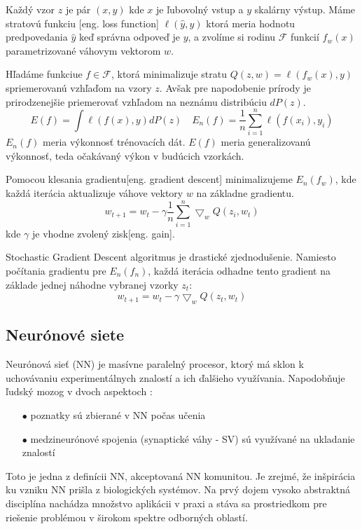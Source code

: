 Každý vzor $z$ je pár $(x, y)$ kde $x$ je ľubovolný vstup a $y$ skalárny výstup.
Máme stratovú funkciu [eng. loss function] $\ell(\hat{y},y)$ ktorá meria hodnotu predpovedania $\hat{y}$ keď správna odpoveď je $y$,
    a zvolíme si rodinu $\mathcal{F}$ funkcií $f_w(x)$ parametrizované váhovym vektorom $w$.

Hľadáme funkciue $f \in \mathcal{F}$, ktorá minimalizuje stratu $Q(z,w) = \ell(f_w(x), y)$ spriemerovanú vzhľaďom na vzory $z$.
Avšak pre napodobenie prírody je prirodzenejšie priemerovať vzhľadom na neznámu distribúciu $dP(z)$\cite{prop:StochasticGradientDescent}.
\begin{equation}
    E(f) = \int{\ell(f(x), y)dP(z)} \quad E_n(f) = \frac{1}{n}\sum_{i=1}^{n}\ell(f(x_i), y_i)
\end{equation}
$E_n(f)$ meria výkonnosť trénovacích dát. $E(f)$ meria generalizovanú výkonnosť, teda očakávaný výkon v budúcich vzorkách.

Pomocou klesania gradientu[eng. gradient descent] minimalizujeme $E_n(f_w)$, kde každá iterácia aktualizuje váhove vektory $w$ na základne gradientu.
\begin{equation}
    w_{t+1} = w_t - \gamma \frac{1}{n}\sum_{i=1}^{n}\bigtriangledown_w Q(z_i, w_t)
\end{equation}
kde $\gamma$ je vhodne zvolený zisk[eng. gain].

Stochastic Gradient Descent algoritmus je drastické zjednodušenie.
Namiesto počítania gradientu pre $E_n(f_n)$, každá iterácia odhadne tento gradient na základe jednej náhodne vybranej vzorky $z_t$\cite{prop:StochasticGradientDescent}:
\begin{equation}
    w_{t+1} = w_t - \gamma \bigtriangledown_w Q(z_t, w_t)
\end{equation}


\subsection{Neurónové siete}
Neurónová sieť (NN) je masívne paralelný procesor, ktorý má sklon k uchovávaniu experimentálnych znalostí a ich ďalšieho využívania.
Napodobňuje ľudský mozog v dvoch aspektoch \cite{odkaz:NNIntroduction}:
\begin{enumerate}
	\item[$\bullet$] poznatky sú zbierané v NN počas učenia
	\item[$\bullet$] medzineurónové spojenia (synaptické váhy - SV) sú využívané na ukladanie znalostí
\end{enumerate}
Toto je jedna z definícii NN, akceptovaná NN komunitou.
Je zrejmé, že inšpirácia ku vzniku NN prišla z biologických systémov.
Na prvý dojem vysoko abstraktná disciplína nachádza množstvo aplikácii v praxi a stáva sa prostriedkom pre riešenie problémou v širokom spektre odborných oblastí\cite{odkaz:NNIntroduction}.

